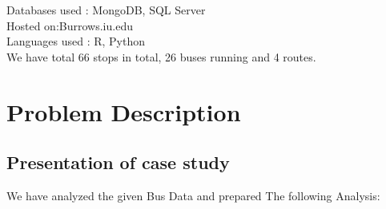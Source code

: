 \documentclass[12pt]{article}
\begin{document}
Databases used  : MongoDB, SQL Server \\

Hosted on:Burrows.iu.edu \\

Languages used : R, Python \\


We have total 66 stops in total, 26 buses running and 4 routes.

\clearpage

\section{Problem Description}
\subsection{Presentation of case study}
We have analyzed the given Bus Data and prepared The following Analysis:
\end{document}
